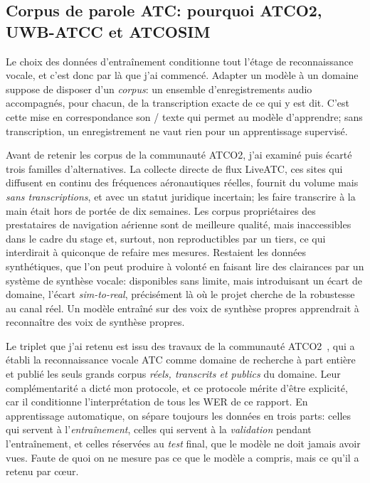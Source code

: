 \documentclass[11pt,a4paper]{article}
\begin{document}
\subsection{Corpus de parole ATC: pourquoi ATCO2, UWB-ATCC et ATCOSIM}
\label{sec:corpus}

Le choix des données d'entraînement conditionne tout l'étage de reconnaissance vocale, et c'est donc par là que j'ai commencé. Adapter un modèle à un domaine suppose de disposer d'un \emph{corpus}: un ensemble d'enregistrements audio accompagnés, pour chacun, de la transcription exacte de ce qui y est dit. C'est cette mise en correspondance son / texte qui permet au modèle d'apprendre; sans transcription, un enregistrement ne vaut rien pour un apprentissage supervisé.

Avant de retenir les corpus de la communauté ATCO2, j'ai examiné puis écarté trois familles d'alternatives. La collecte directe de flux LiveATC, ces sites qui diffusent en continu des fréquences aéronautiques réelles, fournit du volume mais \emph{sans transcriptions}, et avec un statut juridique incertain; les faire transcrire à la main était hors de portée de dix semaines. Les corpus propriétaires des prestataires de navigation aérienne sont de meilleure qualité, mais inaccessibles dans le cadre du stage et, surtout, non reproductibles par un tiers, ce qui interdirait à quiconque de refaire mes mesures. Restaient les données synthétiques, que l'on peut produire à volonté en faisant lire des clairances par un système de synthèse vocale: disponibles sans limite, mais introduisant un écart de domaine, l'écart \emph{sim-to-real}, précisément là où le projet cherche de la robustesse au canal réel. Un modèle entraîné sur des voix de synthèse propres apprendrait à reconnaître des voix de synthèse propres. 

Le triplet que j'ai retenu est issu des travaux de la communauté ATCO2~\cite{atco2,uwbatcc,atcosim}, qui a établi la reconnaissance vocale ATC comme domaine de recherche à part entière et publié les seuls grands corpus \emph{réels, transcrits et publics} du domaine. Leur complémentarité a dicté mon protocole, et ce protocole mérite d'être explicité, car il conditionne l'interprétation de tous les WER de ce rapport. En apprentissage automatique, on sépare toujours les données en trois parts: celles qui servent à l'\emph{entraînement}, celles qui servent à la \emph{validation} pendant l'entraînement, et celles réservées au \emph{test} final, que le modèle ne doit jamais avoir vues. Faute de quoi on ne mesure pas ce que le modèle a compris, mais ce qu'il a retenu par c\oe ur.
\end{document}

